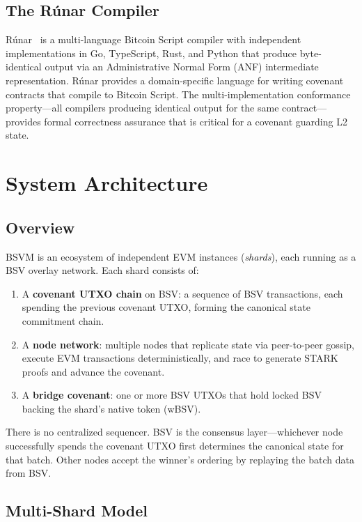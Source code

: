 \documentclass[11pt,twocolumn]{article}
\begin{document}
\subsection{The R\'{u}nar Compiler}

R\'{u}nar~\cite{runar} is a multi-language Bitcoin Script compiler with independent implementations in Go, TypeScript, Rust, and Python that produce byte-identical output via an Administrative Normal Form (ANF) intermediate representation. R\'{u}nar provides a domain-specific language for writing covenant contracts that compile to Bitcoin Script. The multi-implementation conformance property---all compilers producing identical output for the same contract---provides formal correctness assurance that is critical for a covenant guarding L2 state.

\section{System Architecture}
\label{sec:architecture}

\subsection{Overview}

BSVM is an ecosystem of independent EVM instances (\emph{shards}), each running as a BSV overlay network. Each shard consists of:

\begin{enumerate}[nosep,leftmargin=1.5em]
\item A \textbf{covenant UTXO chain} on BSV: a sequence of BSV transactions, each spending the previous covenant UTXO, forming the canonical state commitment chain.
\item A \textbf{node network}: multiple nodes that replicate state via peer-to-peer gossip, execute EVM transactions deterministically, and race to generate STARK proofs and advance the covenant.
\item A \textbf{bridge covenant}: one or more BSV UTXOs that hold locked BSV backing the shard's native token (wBSV).
\end{enumerate}

There is no centralized sequencer. BSV is the consensus layer---whichever node successfully spends the covenant UTXO first determines the canonical state for that batch. Other nodes accept the winner's ordering by replaying the batch data from BSV.

\subsection{Multi-Shard Model}
\end{document}
